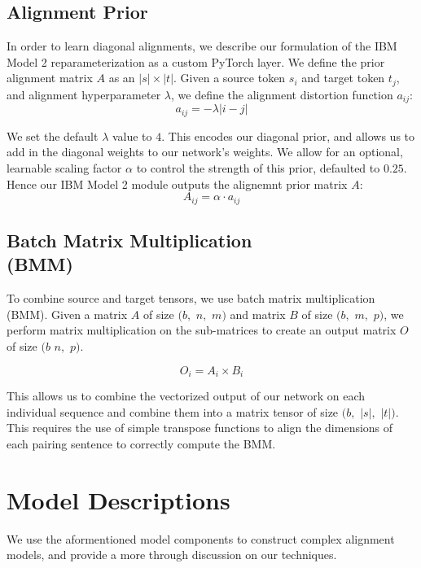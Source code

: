 \documentclass[twoside,twocolumn]{article}
\begin{document}
\subsection{Alignment Prior}
\label{sec:alignment_prior}
In order to learn diagonal alignments, we describe our formulation of the
IBM Model 2 reparameterization as a custom PyTorch layer. We define the prior
alignment matrix $A$ as an $|s| \times |t|$. Given a source token $s_i$ and
target token $t_j$, and alignment hyperparameter $\lambda$, we define the
alignment distortion function $a_{ij}$:
\begin{equation}
  a_{ij} = -\lambda | i - j |
\end{equation}

We set the default $\lambda$ value to $4$. This encodes our diagonal prior,
and allows us to add in the diagonal weights to our network's weights. We
allow for an optional, learnable scaling factor $\alpha$ to control the
strength of this prior, defaulted to $0.25$. Hence our IBM Model 2 module
outputs the alignemnt prior matrix $A$:
\begin{equation}
  A_{ij} = \alpha \cdot a_{ij}
\end{equation}

\subsection{Batch Matrix Multiplication\\(BMM)}
\label{sec:bmm}
To combine source and target tensors, we use batch matrix multiplication (BMM).
Given a matrix $A$ of size $(b,$ $n,$ $m)$ and matrix $B$ of size
$(b,$ $m,$ $p)$, we perform matrix multiplication on the sub-matrices to
create an output matrix $O$ of size $(b$ $n,$ $p)$.

\begin{equation}
  O_i = A_i \times B_i
\end{equation}

This allows us to combine the vectorized output of our network on each
individual sequence and combine them into a matrix tensor of size
$(b,$ $|s|,$ $|t|)$. This requires the use of simple transpose functions to
align the dimensions of each pairing sentence to correctly compute the BMM.

\section{Model Descriptions}
We use the aformentioned model components to construct complex alignment
models, and provide a more through discussion on our techniques.
\end{document}
